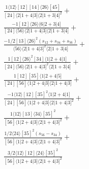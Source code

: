 \documentclass[varwidth, border=5pt]{standalone}
\begin{document}
\begin{my}
$\begin{gathered}
\scriptscriptstyle\frac{1⟨12⟩[12][14]⟨26⟩[45]}{[24]⟨2|1+4|3]⟨2|1+3|4]^2}+\\
\scriptscriptstyle\frac{-1[12]⟨26⟩⟨6|2+3|4]}{[24]⟨56⟩⟨2|1+4|3]⟨2|1+3|4]}+\\
\scriptscriptstyle\frac{-1/2[13]⟨26⟩^2(s_{12}+s_{34}+s_{56})}{⟨56⟩⟨2|1+4|3]^2⟨2|1+3|4]}+\\
\scriptscriptstyle\frac{1[12]⟨26⟩^2[34]⟨1|2+4|1]}{[24]⟨56⟩⟨2|1+4|3]^2⟨2|1+3|4]}+\\
\scriptscriptstyle\frac{1[12][35]⟨1|2+4|5]}{[24][56]⟨1|2+4|3]⟨2|1+4|3]}+\\
\scriptscriptstyle\frac{-1⟨12⟩[12][35]^2⟨1|2+4|1]}{[24][56]⟨1|2+4|3]⟨2|1+4|3]^2}+\\
\scriptscriptstyle\frac{1⟨12⟩[13]⟨34⟩[35]^2}{[56]⟨1|2+4|3]⟨2|1+4|3]^2}+\\
\scriptscriptstyle\frac{1/2⟨24⟩[35]^2(s_{56}-s_{34})}{[56]⟨1|2+4|3]⟨2|1+4|3]^2}+\\
\scriptscriptstyle\frac{3/2⟨12⟩[12]⟨24⟩[35]^2}{[56]⟨1|2+4|3]⟨2|1+4|3]^2}\phantom{+}
\end{gathered}$
\end{my}
\end{document}
